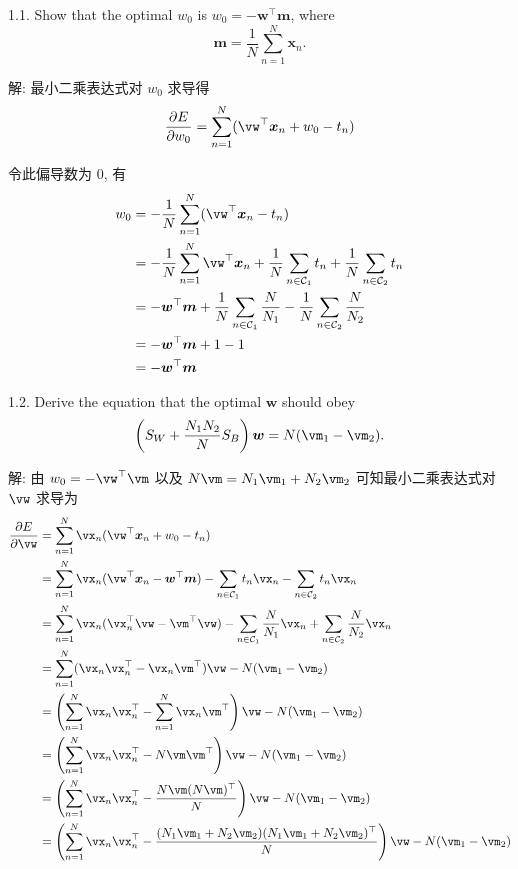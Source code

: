 \documentclass[openany]{ctexbook}
\theoremstyle{kaiti}
\theoremstyle{normal}
\begin{document}
1.1. Show that the optimal $w_{0}$ is $w_{0}=-\bm{w}^{\top}\bm{m}$, where
\begin{equation}
  \bm{m}= \frac{1}{N}\sum_{n=1}^{N}{\bm{x}_{n}}.
\end{equation}

解: 最小二乘表达式对 $w_0$ 求导得
\begin{equation}
  \frac{\partial E}{\partial w_0}=\sum_{n=1}^{N}(\vw^{\top}\bm{x}_{n}+w_{0}-t_{n})
\end{equation}

令此偏导数为 0, 有
\begin{equation}
  \begin{aligned}
    w_0
    &=-\frac{1}{N}\sum_{n=1}^{N}(\vw^{\top}\bm{x}_{n}-t_{n})\\
    &=-\frac{1}{N}\sum_{n=1}^{N}\vw^{\top}\bm{x}_{n}+\frac{1}{N}\sum_{n\in \mathcal{C}_{1}}t_n+\frac{1}{N}\sum_{n\in \mathcal{C}_{2}}t_n\\
    &=-\bm{w}^{\top}\bm{m}+\frac{1}{N}\sum_{n\in \mathcal{C}_{1}}\frac{N}{N_1}-\frac{1}{N}\sum_{n\in \mathcal{C}_{2}}\frac{N}{N_2}\\
    &=-\bm{w}^{\top}\bm{m}+1-1\\
    &=-\bm{w}^{\top}\bm{m}\\
  \end{aligned}
\end{equation}

1.2. Derive the equation that the optimal $\bm{w}$ should obey
\begin{equation}
  \left(S_{W}+\frac{N_{1}N_{2}}{N}S_{B}\right)\bm{w}=N(\vm_1-\vm_2).
  \label{eq:1}
\end{equation}

解: 由 $w_0=-\vw^{\top}\vm$ 以及 $N\vm=N_1\vm_1+N_2\vm_2$ 可知最小二乘表达式对 $\vw$ 求导为
\begin{equation}
  \begin{aligned}
    \frac{\partial E}{\partial \vw}
    &=\sum_{n=1}^{N}\vx_n(\vw^{\top}\bm{x}_{n}+w_{0}-t_{n})\\
    &=\sum_{n=1}^{N}\vx_n(\vw^{\top}\bm{x}_{n}-\bm{w}^{\top}\bm{m})-\sum_{n\in \mathcal{C}_{1}}t_{n}\vx_n-\sum_{n\in \mathcal{C}_{2}}t_{n}\vx_n\\
    &=\sum_{n=1}^{N}\vx_n(\vx_n^{\top}\vw-\vm^{\top}\vw)-\sum_{n\in \mathcal{C}_{1}}\frac{N}{N_1}\vx_n+\sum_{n\in \mathcal{C}_{2}}\frac{N}{N_2}\vx_n\\
    &=\sum_{n=1}^{N}(\vx_n\vx_n^{\top}-\vx_n\vm^{\top})\vw-N(\vm_1-\vm_2)\\
    &=\left(\sum_{n=1}^{N}\vx_n\vx_n^{\top}-\sum_{n=1}^{N}\vx_n\vm^{\top}\right)\vw-N(\vm_1-\vm_2)\\
    &=\left(\sum_{n=1}^{N}\vx_n\vx_n^{\top}-N\vm\vm^{\top}\right)\vw-N(\vm_1-\vm_2)\\
    &=\left(\sum_{n=1}^{N}\vx_n\vx_n^{\top}-\frac{N\vm (N\vm)^{\top}}{N}\right)\vw-N(\vm_1-\vm_2)\\
    &=\left(\sum_{n=1}^{N}\vx_n\vx_n^{\top}-\frac{(N_1\vm_1+N_2\vm_2) (N_1\vm_1+N_2\vm_2)^{\top}}{N}\right)\vw-N(\vm_1-\vm_2)\\
  \end{aligned}
\end{equation}
\end{document}
